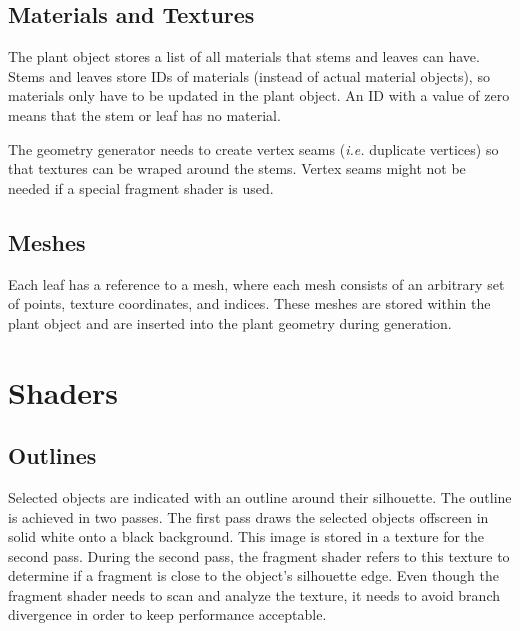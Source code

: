 \documentclass[11pt,letterpaper]{article}
\begin{document}
\subsection{Materials and Textures}

The plant object stores a list of all materials that stems and leaves can have. Stems and leaves store IDs of materials (instead of actual material objects), so materials only have to be updated in the plant object. An ID with a value of zero means that the stem or leaf has no material.

The geometry generator needs to create vertex seams (\textit{i.e.} duplicate vertices) so that textures can be wraped around the stems. Vertex seams might not be needed if a special fragment shader is used.

\subsection{Meshes}

Each leaf has a reference to a mesh, where each mesh consists of an arbitrary set of points, texture coordinates, and indices. These meshes are stored within the plant object and are inserted into the plant geometry during generation.

\section{Shaders}

\subsection{Outlines}

Selected objects are indicated with an outline around their silhouette. The outline is achieved in two passes. The first pass draws the selected objects offscreen in solid white onto a black background. This image is stored in a texture for the second pass. During the second pass, the fragment shader refers to this texture to determine if a fragment is close to the object's silhouette edge. Even though the fragment shader needs to scan and analyze the texture, it needs to avoid branch divergence in order to keep performance acceptable.
\end{document}
